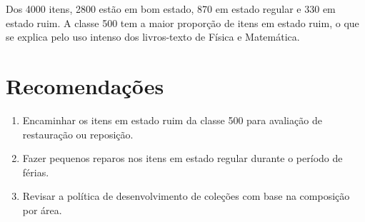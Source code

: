\documentclass[11pt,a4paper]{report}
\newif\ifinstrucoes
\newcommand{\instrucao}[1]{\ifinstrucoes{\color{gray}\small\itshape #1\par}\fi}
\newcommand{\totalbom}{2800}
\newcommand{\totalregular}{870}
\newcommand{\totalruim}{330}
\newcommand{\totalacervo}{4000}
\begin{document}
\instrucao{Destaque a classe mais crítica com o número e o percentual, como no exemplo abaixo.}
Dos \totalacervo{} itens, \totalbom{} estão em bom estado, \totalregular{} em estado regular e \totalruim{} em estado ruim. A classe 500 tem a maior proporção de itens em estado ruim, o que se explica pelo uso intenso dos livros-texto de Física e Matemática.

\section{Recomendações}
\instrucao{Transforme os resultados em ações, com prazo e responsável. Uma lista numerada por prioridade funciona bem.}

\begin{enumerate}
  \item Encaminhar os itens em estado ruim da classe 500 para avaliação de restauração ou reposição.
  \item Fazer pequenos reparos nos itens em estado regular durante o período de férias.
  \item Revisar a política de desenvolvimento de coleções com base na composição por área.
\end{enumerate}

\begingroup
\let\chapter\section
{}
{}

\endgroup
\end{document}

